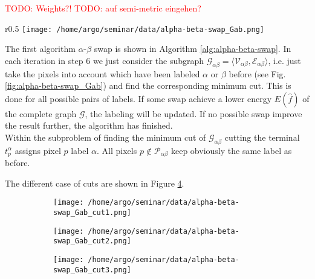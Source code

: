 \documentclass{scrartcl}[12pt, halfparskip]
\newcommand{\todo}[1]{\textcolor{red}{TODO: #1}}
\begin{document}
\todo{Weights?!}
\todo{auf semi-metric eingehen?}

\begin{wrapfigure}{r}{0.5\textwidth} 
	\vspace{-1.5cm}
	\texttt{[image: /home/argo/seminar/data/alpha-beta-swap\_Gab.png]}
	\caption{blubb}
	\label{fig:alpha-beta-swap_Gab}
\end{wrapfigure}

The first algorithm $\alpha$-$\beta$ swap is shown in Algorithm \ref{alg:alpha-beta-swap}. In each iteration in step 6 we just consider the subgraph $\mathcal{G}_{\alpha \beta} = \langle \mathcal{V}_{\alpha \beta}, \mathcal{E}_{\alpha \beta} \rangle$, i.e. just take the pixels into account which have been labeled $\alpha$ or $\beta$ before (see Fig. \ref{fig:alpha-beta-swap_Gab}) and find the corresponding minimum cut. This is done for all possible pairs of labels. If some swap achieve a lower energy $E(\hat{f})$ of the complete graph $\mathcal{G}$, the labeling will be updated. If no possible swap improve the result further, the algorithm has finished. \\

Within the subproblem of finding the minimum cut of $\mathcal{G}_{\alpha \beta}$ cutting the terminal $t_p^\alpha$ assigns pixel $p$ label $\alpha$. 
All pixels $p \notin \mathcal{P}_{\alpha \beta}$ keep obviously the same label as before. 


The different case of cuts are shown in Figure \ref{fig:alpha-beta-swap_Gab_cuts}.


\begin{figure}[H]
	\begin{subfigure}{0.32\textwidth}
		\centering
		\texttt{[image: /home/argo/seminar/data/alpha-beta-swap\_Gab\_cut1.png]}
		\caption{}
		\label{fig:alpha-beta-swap_Gab_cut1}
	\end{subfigure}
	\begin{subfigure}{0.32\textwidth}
		\centering
		\texttt{[image: /home/argo/seminar/data/alpha-beta-swap\_Gab\_cut2.png]}
		\caption{}
		\label{fig:alpha-beta-swap_Gab_cut2}
	\end{subfigure}
	\begin{subfigure}{0.32\textwidth}
		\centering
		\texttt{[image: /home/argo/seminar/data/alpha-beta-swap\_Gab\_cut3.png]}
		\caption{}
		\label{fig:alpha-beta-swap_Gab_cut3}
	\end{subfigure}
\caption{}
\label{fig:alpha-beta-swap_Gab_cuts}
\end{figure}
\end{document}
